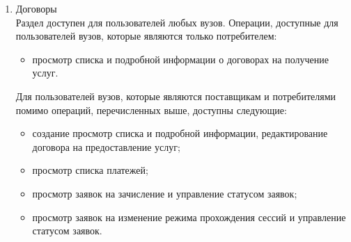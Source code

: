\begin{enumerate}
	\item Договоры\\
	Раздел доступен для пользователей любых вузов. Операции, доступные для пользователей вузов, которые являются только потребителем:
	\begin{itemize}
		\item просмотр списка и подробной информации о договорах на получение услуг.
	\end{itemize}
	Для пользователей вузов, которые являются поставщикам и потребителями помимо операций, перечисленных выше, доступны следующие:
	\begin{itemize}
		\item создание просмотр списка и подробной информации, редактирование договора на предоставление услуг;
		\item просмотр списка платежей;
		\item просмотр заявок на зачисление и управление статусом заявок;
		\item просмотр заявок на изменение режима прохождения сессий и управление статусом заявок.
	\end{itemize}

\end{enumerate}


